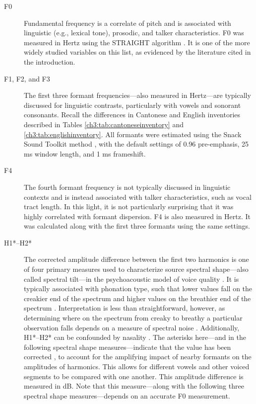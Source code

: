 \begin{description}
    \item[F0] Fundamental frequency is a correlate of pitch and is associated with linguistic (e.g., lexical tone), prosodic, and talker characteristics. F0 was measured in Hertz using the STRAIGHT algorithm \citep{kawahara_2016_straight}. It is one of the more widely studied variables on this list, as evidenced by the literature cited in the introduction.
    \item[F1, F2, and F3] The first three formant frequencies---also measured in Hertz---are typically discussed for linguistic contrasts, particularly with vowels and sonorant consonants. Recall the differences in Cantonese and English inventories described in Tables \ref{ch3:tab:cantoneseinventory} and \ref{ch3:tab:englishinventory}. All formants were estimated using the Snack Sound Toolkit method \cite{sjolander_2004_snack}, with the default settings of 0.96 pre-emphasis, 25 ms window length, and 1 ms frameshift.
    \item[F4] The fourth formant frequency is not typically discussed in linguistic contexts and is instead associated with talker characteristics, such as vocal tract length. In this light, it is not particularly surprising that it was highly correlated with formant dispersion. F4 is also measured in Hertz. It was calculated along with the first three formants using the same settings.
    \item[H1*--H2*] The corrected amplitude difference between the first two harmonics is one of four primary measures used to characterize source spectral shape---also called spectral tilt---in the psychoacoustic model of voice quality \citep{kreiman_2014_theory}. It is typically associated with phonation type, such that lower values fall on the creakier end of the spectrum and higher values on the breathier end of the spectrum \citep{garellek_2019_voice}. Interpretation is less than straightforward, however, as determining where on the spectrum from creaky to breathy a particular observation falls depends on a measure of spectral noise \citep[e.g., CPP below;][]{garellek_2019_voice}. Additionally, H1*--H2* can be confounded by nasality \citep{munson_2019_phonetics}. The asterisks here---and in the following spectral shape measures---indicate that the value has been corrected \citep{iseli_2007_voice}, to account for the amplifying impact of nearby formants on the amplitudes of harmonics. This allows for different vowels and other voiced segments to be compared with one another. This amplitude difference is measured in dB. Note that this measure---along with the following three spectral shape measures---depends on an accurate F0 measurement.

\end{description}
